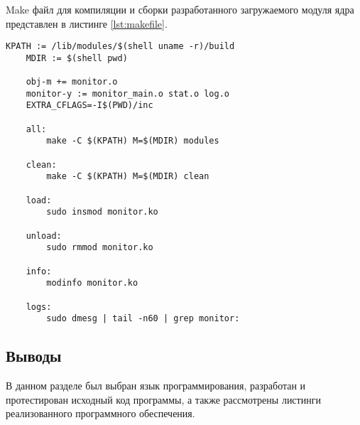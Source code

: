 Make файл для компиляции и сборки разработанного загружаемого модуля ядра представлен в листинге \ref{lst:makefile}.

\begin{lstlisting}[label={lst:makefile}, caption={реализация make файла}]
	KPATH := /lib/modules/$(shell uname -r)/build
	MDIR := $(shell pwd)
	
	obj-m += monitor.o
	monitor-y := monitor_main.o stat.o log.o
	EXTRA_CFLAGS=-I$(PWD)/inc
	
	all:
		make -C $(KPATH) M=$(MDIR) modules
	
	clean:
		make -C $(KPATH) M=$(MDIR) clean
	
	load:
		sudo insmod monitor.ko
	
	unload:
		sudo rmmod monitor.ko
	
	info:
		modinfo monitor.ko
	
	logs:
		sudo dmesg | tail -n60 | grep monitor:
\end{lstlisting}

\subsection*{Выводы}

В данном разделе был выбран язык программирования, разработан и протестирован исходный код программы, а также рассмотрены листинги реализованного программного обеспечения.
